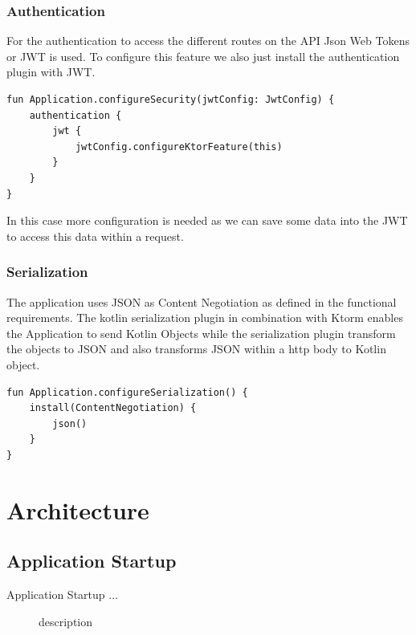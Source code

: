 \subsubsection{Authentication}

For the authentication to access the different routes on the API Json Web Tokens or JWT is used. To configure this feature we also just install the authentication plugin with JWT.

\begin{verbatim}
fun Application.configureSecurity(jwtConfig: JwtConfig) {
    authentication {
        jwt {
            jwtConfig.configureKtorFeature(this)
        }
    }
}
\end{verbatim}

In this case more configuration is needed as we can save some data into the JWT to access this data within a request.

\subsubsection{Serialization}

The application uses JSON as Content Negotiation as defined in the functional requirements. The kotlin serialization plugin in combination with Ktorm enables the Application to send Kotlin Objects while the serialization plugin transform the objects to JSON and also transforms JSON within a http body to Kotlin object. 

\begin{verbatim}
fun Application.configureSerialization() {
    install(ContentNegotiation) {
        json()
    }
}
\end{verbatim}

\section{Architecture}

\subsection{Application Startup}

Application Startup ...

\newpage

\begin{figure}[h]
\centering

\caption{\label{fig:startup}description}
\end{figure}

